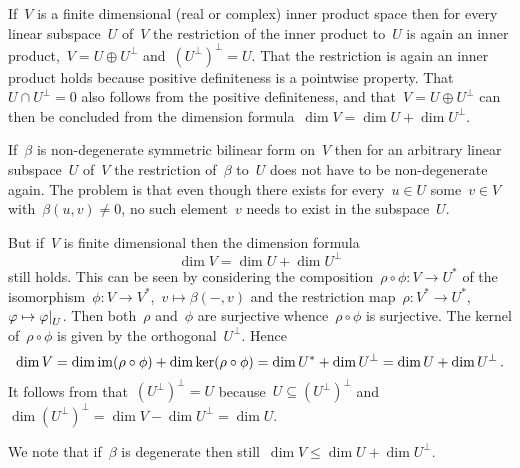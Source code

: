 \begin{recall}
  \label{reviewing orthogonals}
  If~$V$ is a finite dimensional (real or complex) inner product space then for every linear subspace~$U$ of~$V$ the restriction of the inner product to~$U$ is again an inner product,~$V = U \oplus U^\perp$ and~$(U^\perp)^\perp = U$.
  That the restriction is again an inner product holds because positive definiteness is a pointwise property.
  That~$U \cap U^\perp = 0$ also follows from the positive definiteness, and that~$V = U \oplus U^\perp$ can then be concluded from the dimension formula~$\dim V = \dim U + \dim U^\perp$.
  
  If~$\beta$ is non-degenerate symmetric bilinear form on~$V$ then for an arbitrary linear subspace~$U$ of~$V$ the restriction of~$\beta$ to~$U$ does not have to be non-degenerate again.
  The problem is that even though there exists for every~$u \in U$ some~$v \in V$ with~$\beta(u,v) \neq 0$, no such element~$v$ needs to exist in the subspace~$U$.
  
  But if~$V$ is finite dimensional then the dimension formula
  \[
    \dim V
    =
    \dim U + \dim U^\perp
  \]
  still holds.
  This can be seen by considering the composition~$\rho \circ \phi \colon V \to U^*$ of the isomorphism~$\phi \colon V \to V^*$,~$v \mapsto \beta(-,v)$ and the restriction map~$\rho \colon V^* \to U^*$,~$\varphi \mapsto \restrict{\varphi}{U}$.
  Then both~$\rho$ and~$\phi$ are surjective whence~$\rho \circ \phi$ is surjective.
  The kernel of~$\rho \circ \phi$ is given by the orthogonal~$U^\perp$.
  Hence
  \[
    \dim V
    =
    \dim \operatorname{im} (\rho \circ \phi)
    +
    \dim \ker (\rho \circ \phi)
    =
    \dim U^* + \dim U^\perp
    =
    \dim U + \dim U^\perp \,.
  \]
  It follows from that~$(U^\perp)^\perp = U$ because~$U \subseteq (U^\perp)^\perp$ and~$\dim (U^\perp)^\perp = \dim V - \dim U^\perp = \dim U$.
  
  We note that if~$\beta$ is degenerate then still~$\dim V \leq \dim U + \dim U^\perp$.
  

\end{recall}
